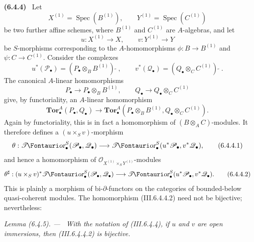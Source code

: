 \documentclass[10pt,oneside]{book}
\newcommand{\sh}[1]{\mathscr{#1}}
\newcommand{\shTor}{\sh{T}\textup{\kern-2.2pt{\Fontauri\slshape or}}}
\newcommand{\vphi}{\phi}
\newcommand{\supertilde}{{\,\widetilde{\,}\,}}
\newcommand{\Spec}{\operatorname{Spec}}
\newcommand{\sref}[2][]{(#2)}
\newcommand{\oldpage}[2][]{\setcounter{footnote}{0}\marginpar{\scriptsize\textbf{#1}~|~#2}\ignorespaces}
\newenvironment{env}[1][]{\par\medskip\noindent\textbf{(#1)}\ }{\par}
\newenvironment{lemma}[1][]{\par\medskip\noindent\itshape Lemma (#1). ---\ }{\par}
\begin{document}
\begin{env}[6.4.4]
\label{III.6.4.4}
Let
\[
  X^{(1)}=\Spec(B^{(1)}),
  \qquad
  Y^{(1)}=\Spec(C^{(1)})
\]
be two further affine schemes, where $B^{(1)}$ and $C^{(1)}$ are
$A$-algebras, and let
\oldpage[III]{147}
\[
  u:X^{(1)}\longrightarrow X,
  \qquad
  v:Y^{(1)}\longrightarrow Y
\]
be $S$-morphisms corresponding to the $A$-homomorphisms
$\vphi:B\longrightarrow B^{(1)}$ and
$\psi:C\longrightarrow C^{(1)}$.  Consider the complexes
\[
  u^*(\sh P_\bullet)
  =
  (P_\bullet\otimes_BB^{(1)})\supertilde,
  \qquad
  v^*(\sh Q_\bullet)
  =
  (Q_\bullet\otimes_CC^{(1)})\supertilde.
\]
The canonical $A$-linear homomorphisms
\[
  P_\bullet\longrightarrow P_\bullet\otimes_BB^{(1)},
  \qquad
  Q_\bullet\longrightarrow Q_\bullet\otimes_CC^{(1)}
\]
give, by functoriality, an $A$-linear homomorphism
\[
  \mathbf{Tor}_\bullet^A(P_\bullet,Q_\bullet)
  \longrightarrow
  \mathbf{Tor}_\bullet^A
  (P_\bullet\otimes_BB^{(1)},
   Q_\bullet\otimes_CC^{(1)}).
\]
Again by functoriality, this is in fact a homomorphism of
$(B\otimes_AC)$-modules.  It therefore defines a
$(u\times_Sv)$-morphism
\[
  \theta:
  \shTor_\bullet^S(\sh P_\bullet,\sh Q_\bullet)
  \longrightarrow
  \shTor_\bullet^S(u^*\sh P_\bullet,v^*\sh Q_\bullet),
  \tag{6.4.4.1}\label{III.6.4.4.1}
\]
and hence a homomorphism of
$\sh O_{X^{(1)}\times_SY^{(1)}}$-modules
\[
  \theta^\sharp:
  (u\times_Sv)^*
  \shTor_\bullet^S(\sh P_\bullet,\sh Q_\bullet)
  \longrightarrow
  \shTor_\bullet^S(u^*\sh P_\bullet,v^*\sh Q_\bullet).
  \tag{6.4.4.2}\label{III.6.4.4.2}
\]
This is plainly a morphism of bi-$\partial$-functors on the
categories of bounded-below quasi-coherent modules.  The
homomorphism \sref{III.6.4.4.2} need not be bijective; nevertheless:
\end{env}

\begin{lemma}[6.4.5]
\label{III.6.4.5}
With the notation of \sref{III.6.4.4}, if $u$ and $v$ are open
immersions, then \sref{III.6.4.4.2} is bijective.
\end{lemma}
\end{document}
